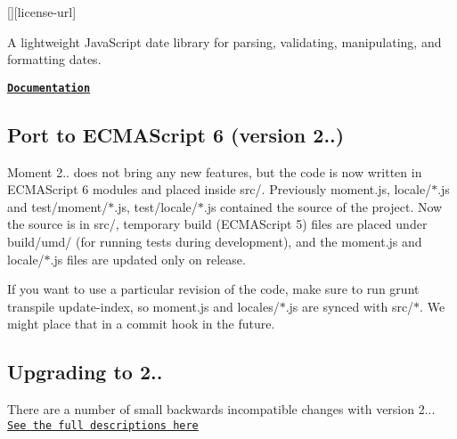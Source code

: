\href{https://gitter.im/moment/moment?utm_source=badge&utm_medium=badge&utm_campaign=pr-badge&utm_content=badge}{\tt }

\href{https://npmjs.org/package/moment}{\tt } \href{https://npmcharts.com/compare/moment?minimal=true}{\tt } \mbox{[}\mbox{]}\mbox{[}license-\/url\mbox{]} \href{http://travis-ci.org/moment/moment}{\tt } \href{https://coveralls.io/r/moment/moment?branch=develop}{\tt } \href{https://app.fossa.io/projects/git%2Bhttps%3A%2F%2Fgithub.com%2Fmoment%2Fmoment?ref=badge_shield}{\tt } \href{https://dependabot.com/compatibility-score.html?dependency-name=moment&package-manager=npm_and_yarn&version-scheme=semver}{\tt }

A lightweight Java\+Script date library for parsing, validating, manipulating, and formatting dates.

{\bfseries \href{http://momentjs.com/docs/}{\tt Documentation}}

\subsection*{Port to E\+C\+M\+A\+Script 6 (version 2..)}

Moment 2.. does not bring any new features, but the code is now written in E\+C\+M\+A\+Script 6 modules and placed inside {\ttfamily src/}. Previously {\ttfamily moment.\+js}, {\ttfamily locale/$\ast$.js} and {\ttfamily test/moment/$\ast$.js}, {\ttfamily test/locale/$\ast$.js} contained the source of the project. Now the source is in {\ttfamily src/}, temporary build (E\+C\+M\+A\+Script 5) files are placed under {\ttfamily build/umd/} (for running tests during development), and the {\ttfamily moment.\+js} and {\ttfamily locale/$\ast$.js} files are updated only on release.

If you want to use a particular revision of the code, make sure to run {\ttfamily grunt transpile update-\/index}, so {\ttfamily moment.\+js} and {\ttfamily locales/$\ast$.js} are synced with {\ttfamily src/$\ast$}. We might place that in a commit hook in the future.

\subsection*{Upgrading to 2..}

There are a number of small backwards incompatible changes with version 2... \href{https://gist.github.com/timrwood/e72f2eef320ed9e37c51#backwards-incompatible-changes}{\tt See the full descriptions here}


